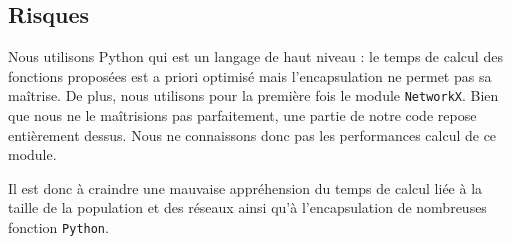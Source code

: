 \subsection{Risques}
Nous utilisons Python qui est un langage de haut niveau : le temps de calcul des fonctions proposées est a priori optimisé mais l'encapsulation ne permet pas sa maîtrise. De plus, nous utilisons pour la première fois le module \verb?NetworkX?. Bien que nous ne le ma\^itrisions pas parfaitement, une partie de notre code repose entièrement dessus. Nous ne connaissons donc pas les performances calcul de ce module.

Il est donc à craindre une mauvaise appréhension du temps de calcul liée à la taille de la population et des réseaux ainsi qu'à l'encapsulation de nombreuses fonction \verb?Python?.


